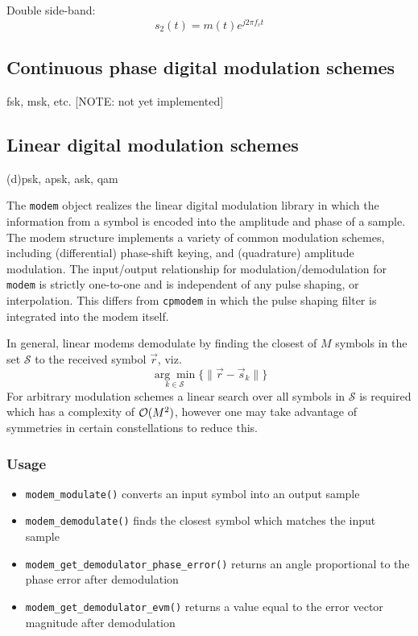 Double side-band:
\[
    s_2(t) = m(t)e^{j 2 \pi f_c t}
\]

\subsection{Continuous phase digital modulation schemes}
fsk, msk, etc. [NOTE: not yet implemented]

\subsection{Linear digital modulation schemes}
\label{module:modem:digital}
(d)psk, apsk, ask, qam

The {\tt modem} object realizes the linear digital modulation library in which
the information from a symbol is encoded into the amplitude and phase of a
sample.
The modem structure implements a variety of common modulation schemes,
including (differential) phase-shift keying, and (quadrature) amplitude
modulation.
The input/output relationship for modulation/demodulation for {\tt modem} is
strictly one-to-one and is independent of any pulse shaping, or interpolation.
This differs from {\tt cpmodem} in which the pulse shaping filter is
integrated into the modem itself.

In general, linear modems demodulate by finding the closest of $M$ symbols in
the set $\mathcal{S}$ to the received symbol $\vec{r}$, viz.
\[
    \underset{k \in \mathcal{S}}{\arg\min}
    \bigl\{
        \| \vec{r} - \vec{s}_k \|
    \bigr\}
\]
For arbitrary modulation schemes a linear search over all symbols in
$\mathcal{S}$ is required which has a complexity of $\mathcal{O}(M^2)$, however one may
take advantage of symmetries in certain constellations to reduce this.

\subsubsection{Usage}
\begin{itemize}
\item[] {\tt modem\_modulate()} converts an input symbol into an output sample
\item[] {\tt modem\_demodulate()} finds the closest symbol which matches the
input sample
\item[] {\tt modem\_get\_demodulator\_phase\_error()} returns an angle
proportional to the phase error after demodulation
\item[] {\tt modem\_get\_demodulator\_evm()} returns a value equal to the
error vector magnitude after demodulation
\end{itemize}

